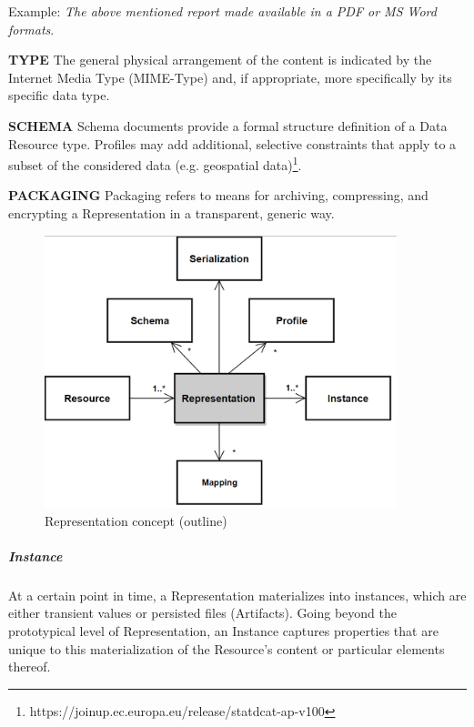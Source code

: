 Example: \textit{The above mentioned report made available in a PDF or MS Word formats}. 

\textbf{TYPE} The general physical arrangement of the content is indicated by the Internet Media Type (MIME-Type) and, if appropriate, more specifically by its specific data type.

\textbf{SCHEMA} Schema documents provide a formal structure definition of a Data Resource type. Profiles may add additional, selective constraints that apply to a subset of the considered data (e.g. geospatial data)\footnote{https://joinup.ec.europa.eu/release/statdcat-ap-v100 }.

\textbf{PACKAGING} Packaging refers to means for archiving, compressing, and encrypting a Representation in a transparent, generic way.




\begin{figure}[H]
	\begin{Center}
		\includegraphics[width=4.03in,height=3.12in]{./media/image36.png}
		\caption{Representation concept (outline)}
		\label{fig:Representation_concept_outline}
	\end{Center}
\end{figure}




\subparagraph*{Instance}
At a certain point in time, a Representation materializes into instances, which are either transient values or persisted files (Artifacts). Going beyond the prototypical level of Representation, an Instance captures properties that are unique to this materialization of the Resource’s content or particular elements thereof. 



